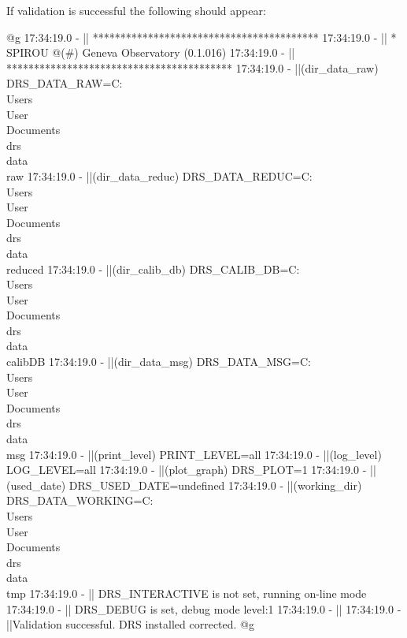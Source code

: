 \noindent If validation is successful the following should appear:
\begin{cmdboxprintspecial}
@g
17:34:19.0 -   || *****************************************
17:34:19.0 -   || * SPIROU @(#) Geneva Observatory (0.1.016)
17:34:19.0 -   || *****************************************
17:34:19.0 -   ||(dir_data_raw)      DRS_DATA_RAW=C:\\Users\\User\\Documents\\drs\\data\\raw
17:34:19.0 -   ||(dir_data_reduc)    DRS_DATA_REDUC=C:\\Users\\User\\Documents\\drs\\data\\reduced
17:34:19.0 -   ||(dir_calib_db)      DRS_CALIB_DB=C:\\Users\\User\\Documents\\drs\\data\\calibDB
17:34:19.0 -   ||(dir_data_msg)      DRS_DATA_MSG=C:\\Users\\User\\Documents\\drs\\data\\msg
17:34:19.0 -   ||(print_level)       PRINT_LEVEL=all         %
17:34:19.0 -   ||(log_level)         LOG_LEVEL=all         %
17:34:19.0 -   ||(plot_graph)        DRS_PLOT=1            %
17:34:19.0 -   ||(used_date)         DRS_USED_DATE=undefined
17:34:19.0 -   ||(working_dir)       DRS_DATA_WORKING=C:\\Users\\User\\Documents\\drs\\data\\tmp
17:34:19.0 -   ||                    DRS_INTERACTIVE is not set, running on-line mode
17:34:19.0 -   ||                    DRS_DEBUG is set, debug mode level:1
17:34:19.0 -   ||
17:34:19.0 -   ||Validation successful. DRS installed corrected.
@g
\end{cmdboxprintspecial}